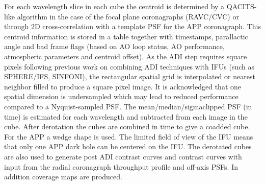 For each wavelength slice in each cube the centroid is determined by a
QACITS-like algorithm in the case of the focal plane coronagraphs
(RAVC/CVC) or through 2D cross-correlation with a template PSF for the
APP coronagraph. This centroid information is stored in a table
together with timestamps, parallactic angle and bad frame flags (based
on AO loop status, AO performance, atmospheric parameters and centroid
offset).  As the ADI step requires square pixels following previous
work on combining ADI techniques with IFUs (such as SPHERE/IFS,
SINFONI), the rectangular spatial grid is interpolated or nearest
neighbor filled to produce a square pixel image.  It is acknowledged
that one spatial dimension is undersampled which may lead to reduced
performance compared to a Nyquist-sampled PSF.  The
mean/median/sigmaclipped PSF (in time) is estimated for each
wavelength and subtracted from each image in the cube.  After
derotation the cubes are combined in time to give a coadded cube. For
the APP a wedge shape is used. The limited field of view of the IFU
means that only one APP dark hole can be centered on the IFU. The derotated cubes
are also used to generate post ADI contrast curves and contrast curves
with input from the radial coronagraph throughput profile and off-axis
PSFs. In addition coverage maps are produced.





